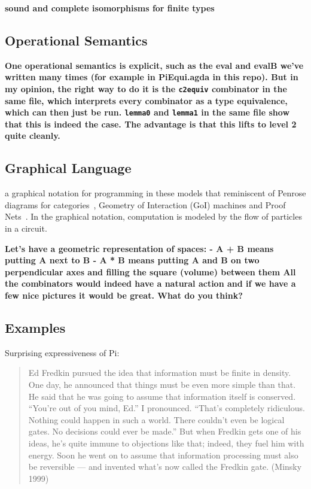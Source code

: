 \documentclass{article}
\newcommand{\amr}[1]{\fbox{Amr says:} \textbf{#1}}
\newcommand{\jc}[1]{\fbox{Jacques says:} \textbf{#1}}
\begin{document}
\amr{sound and complete isomorphisms for finite types}

\subsection{Operational Semantics}

\jc{One operational semantics is explicit, such as the eval and
evalB we've written many times (for example in PiEqui.agda in
this repo). But in my opinion, the right way to do it is the
\texttt{c2equiv} combinator in the same file, which interprets
every combinator as a type equivalence, which can then just be
run. \texttt{lemma0} and \texttt{lemma1} in the same file show
that this is indeed the case. The advantage is that this lifts
to level 2 quite cleanly.}

\subsection{Graphical Language}

a graphical notation for programming in these models that reminiscent
of Penrose diagrams for categories~\cite{selinger-graphical}, Geometry
of Interaction (GoI) machines and Proof
Nets~\cite{Mackie2011,DBLP:conf/popl/Mackie95}. In the graphical
notation, computation is modeled by the flow of particles in a
circuit.

\amr{
  Let’s have a geometric representation of spaces:
- A + B means putting A next to B
- A * B means putting A and B on two perpendicular axes and filling
the square (volume) between them
All the combinators would indeed have a natural action and if we have
a few nice pictures it would be great. What do you think? }

\subsection{Examples}

Surprising expressiveness of Pi:

\begin{quote}
  Ed Fredkin pursued the idea that information must be finite in
  density. One day, he announced that things must be even more simple
  than that. He said that he was going to assume that information
  itself is conserved. “You’re out of you mind, Ed.” I
  pronounced. “That’s completely ridiculous. Nothing could happen in
  such a world. There couldn’t even be logical gates. No decisions
  could ever be made.” But when Fredkin gets one of his ideas, he’s
  quite immune to objections like that; indeed, they fuel him with
  energy. Soon he went on to assume that information processing must
  also be reversible — and invented what’s now called the Fredkin
  gate. (Minsky 1999)
\end{quote}
\end{document}
